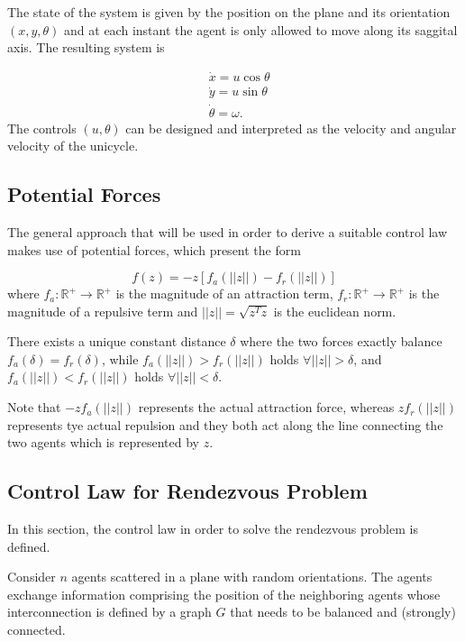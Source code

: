 \documentclass[11pt]{article}
\begin{document}
The state of the system is given by the position on the plane and its orientation $(x, y, \theta)$ and at each instant the agent is only allowed to move along its saggital axis. The resulting system is

\begin{align}
&\dot{x} = u\cos\theta\\
&\dot{y} = u\sin\theta\\
&\dot{\theta} = \omega.
\end{align}
The controls $(u, \theta)$ can be designed and interpreted as the velocity and angular velocity of the unicycle.

\subsection*{Potential Forces}

The general approach that will be used in order to derive a suitable control law makes use of potential forces, which present the form

\begin{equation}
f(z) = -z[f_a(||z||)-f_r(||z||)]
\end{equation}
where $f_a: \mathbb{R}^+ \rightarrow \mathbb{R}^+$ is the magnitude of an attraction term, $f_r: \mathbb{R}^+ \rightarrow \mathbb{R}^+$ is the magnitude of a repulsive term and $||z|| = \sqrt{z^Tz}$ is the euclidean norm.

There exists a unique constant distance $\delta$ where the two forces exactly balance $f_a(\delta) = f_r(\delta)$, while $f_a(||z||) > f_r(||z||)$ holds $\forall||z|| > \delta$, and $f_a(||z||) < f_r(||z||)$ holds $\forall||z|| < \delta$.

Note that $-zf_a(||z||)$ represents the actual attraction force, whereas $zf_r(||z||)$ represents tye actual repulsion and they both act along the line connecting the two agents which is represented by $z$.

\subsection*{Control Law for Rendezvous Problem}

In this section, the control law in order to solve the rendezvous problem is defined.

Consider $n$ agents scattered in a plane with random orientations. The agents exchange information comprising the position of the neighboring agents whose interconnection is defined by a graph $G$ that needs to be balanced and (strongly) connected.
\end{document}
